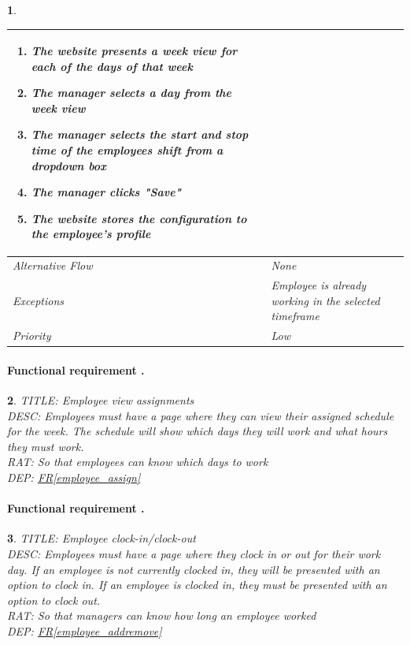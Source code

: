 \documentclass{scrreprt}
\theoremstyle{funreq}
\newtheorem{funreq}{}
\newcommand*{\reqref}[1]{\hyperref[#1]{FR\ref*{#1}}}
\begin{document}
\begin{funreq}
\begin{table}[H]
{\begin{tabularx}{\columnwidth}{|l|X|}
\begin{enumerate}
    					\item The website presents a week view for each of the days of that week
    					\item The manager selects a day from the week view
    					\item The manager selects the start and stop time of the employees shift from a dropdown box
    					\item The manager clicks "Save"
    					\item The website stores the configuration to the employee's profile
					\end{enumerate}
					\\ \hline Alternative Flow & 
					None
					\\ \hline Exceptions & 
					Employee is already working in the selected timeframe
					\\ \hline Priority & 
					Low
					\\ \hline
				\end{tabularx}%
			}
		\end{table}
	\end{funreq}
	
	\paragraph[]{Functional requirement .}
	\begin{funreq}
		\label{employee_viewwork}
		TITLE: Employee view assignments\\
		DESC: Employees must have a page where they can view their assigned schedule for the week.  The schedule will show which days they will work and what hours they must work.\\
		RAT: So that employees can know which days to work\\
		DEP: \reqref{employee_assign}
	\end{funreq}
	
	\paragraph[]{Functional requirement .}
	\begin{funreq}
		\label{employee_clock}
		TITLE: Employee clock-in/clock-out\\
		DESC: Employees must have a page where they clock in or out for their work day.  If an employee is not currently clocked in, they will be presented with an option to clock in.  If an employee is clocked in, they must be presented with an option to clock out.\\
		RAT: So that managers can know how long an employee worked\\
		DEP: \reqref{employee_addremove}
	\end{funreq}
	
\end{document}
